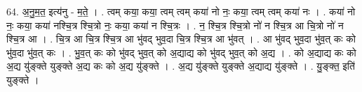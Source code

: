\documentclass[17pt]{extarticle}
\begin{document}
64. अ॒नु॒म॒त॒ इत्य॑नु - म॒ते॒ । . त्वम् कया॒ कया॒ त्वम् त्वम् कया॑ नो नः॒ कया॒ त्वम् त्वम् कया॑ नः । . कया॑ नो नः॒ कया॒ कया॑ नश्चि॒त्र श्चि॒त्रो नः॒ कया॒ कया॑ न श्चि॒त्रः । . न॒ श्चि॒त्र श्चि॒त्रो नो॑ न श्चि॒त्र आ चि॒त्रो नो॑ न श्चि॒त्र आ । . चि॒त्र आ चि॒त्र श्चि॒त्र आ भु॑वद् भुव॒दा चि॒त्र श्चि॒त्र आ भु॑वत् । . आ भु॑वद् भुव॒दा भु॑व॒त् कः को भु॑व॒दा भु॑व॒त् कः । . भु॒व॒त् कः को भु॑वद् भुव॒त् को अ॒द्याद्य को भु॑वद् भुव॒त् को अ॒द्य । . को अ॒द्याद्य कः को अ॒द्य यु॑ङ्क्ते युङ्क्ते अ॒द्य कः को अ॒द्य यु॑ङ्क्ते । . अ॒द्य यु॑ङ्क्ते युङ्क्ते अ॒द्याद्य यु॑ङ्क्ते । . यु॒ङ्क्त॒ इति॑ युङ्क्ते । \newline
\pagebreak
\end{document}
